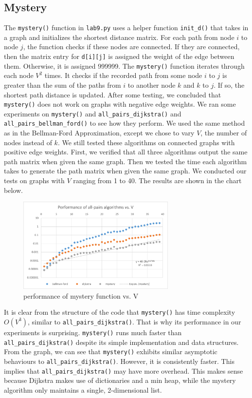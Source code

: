 \documentclass[12pt]{article}
\begin{document}
\subsection{Mystery}
The \verb+mystery()+ function in \verb+lab9.py+ uses a helper function \verb+init_d()+ that takes in a graph and initializes the shortest distance matrix. For each path from node $i$ to node $j$, the function checks if these nodes are connected. If they are connected, then the matrix entry for \verb+d[i][j]+ is assigned the weight of the edge between them. Otherwise, it is assigned 999999. The \verb+mystery()+ function iterates through each node $V^2$ times. It checks if the recorded path from some node $i$ to $j$ is greater than the sum of the paths from $i$ to another node $k$ and $k$ to $j$. If so, the shortest path distance is updated. After some testing, we concluded that \verb+mystery()+ does not work on graphs with negative edge weights. We ran some experiments on \verb+mystery()+ and \verb+all_pairs_dijkstra()+ and \verb+all_pairs_bellman_ford()+ to see how they perform. We used the same method as in the Bellman-Ford Approximation, except we chose to vary $V$, the number of nodes instead of $k$. We still tested these algorithms on connected graphs with positive edge weights. First, we verified that all three algorithms output the same path matrix when given the same graph. Then we tested the time each algorithm takes to generate the path matrix when given the same graph. We conducted our tests on graphs with $V$ ranging from 1 to 40. The results are shown in the chart below.
\begin{figure}[H]
\centering
\includegraphics[width=0.7\textwidth,height=\textheight,keepaspectratio]{mystery.png}
\caption{performance of mystery function vs. V}
\label{Figure: m3}
\end{figure}
\noindent It is clear from the structure of the code that \verb+mystery()+ has time complexity $O(V^3)$, similar to \verb+all_pairs_dijkstra()+. That is why its performance in our experiments is surprising. \verb+mystery()+ runs much faster than \verb+all_pairs_dijkstra()+ despite its simple implementation and data structures. From the graph, we can see that \verb+mystery()+ exhibits similar asymptotic behaviours to \verb+all_pairs_dijkstra()+. However, it is consistently faster. This implies that \verb+all_pairs_dijkstra()+ may have more overhead. This makes sense because Dijkstra makes use of dictionaries and a min heap, while the mystery algorithm only maintains a single, 2-dimensional list.
\end{document}
